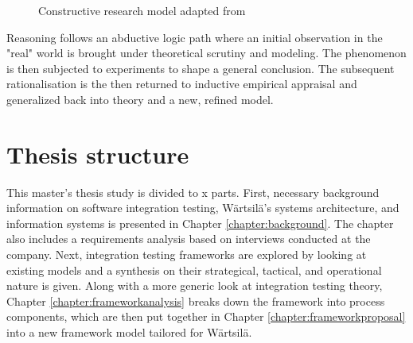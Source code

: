 \documentclass[12pt,a4paper,oneside,pdftex]{report}
\begin{document}
\begin{figure}[H]
\centering
\caption{Constructive research model adapted from \citet{kasanen1993constructive}} \label{fig:constructive}
\end{figure}

Reasoning follows an abductive logic path where an initial observation in the "real" world is brought under theoretical scrutiny and modeling. The phenomenon is then subjected to experiments to shape a general conclusion. \citep{josephson1996abductive} The subsequent rationalisation is the then returned to inductive empirical appraisal and generalized back into theory and a new, refined model. 


\section{Thesis structure}
\label{section:structure}
This master's thesis study is divided to x parts. First, necessary background information on software integration testing, Wärtsilä's systems architecture, and information systems is presented in Chapter \ref{chapter:background}. The chapter also includes a requirements analysis based on interviews conducted at the company. Next, integration testing frameworks are explored by looking at existing models and a synthesis on their strategical, tactical, and operational nature is given. Along with a more generic look at integration testing theory, Chapter \ref{chapter:frameworkanalysis} breaks down the framework into process components, which are then put together in Chapter \ref{chapter:frameworkproposal} into a new framework model tailored for Wärtsilä.
\end{document}
